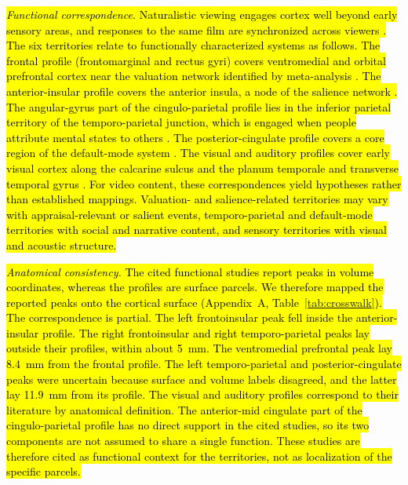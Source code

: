 \documentclass{ieeeaccess}
\newcommand{\rev}[1]{\hl{#1}}
\newcommand{\rev}[1]{#1}
\begin{document}
\rev{\textit{Functional correspondence.} Naturalistic viewing engages cortex well beyond early sensory areas, and responses to the same film are synchronized across viewers \mbox{\cite{hasson2004intersubject}}. The six territories relate to functionally characterized systems as follows. The frontal profile (frontomarginal and rectus gyri) covers ventromedial and orbital prefrontal cortex near the valuation network identified by meta-analysis \mbox{\cite{bartra2013valuation}}. The anterior-insular profile covers the anterior insula, a node of the salience network \mbox{\cite{seeley2007salience}}. The angular-gyrus part of the cingulo-parietal profile lies in the inferior parietal territory of the temporo-parietal junction, which is engaged when people attribute mental states to others \mbox{\cite{saxe2003people}}. The posterior-cingulate profile covers a core region of the default-mode system \mbox{\cite{raichle2001default}}. The visual and auditory profiles cover early visual cortex along the calcarine sulcus \mbox{\cite{wandell2007visual}} and the planum temporale and transverse temporal gyrus \mbox{\cite{griffiths2002planum}}. For video content, these correspondences yield hypotheses rather than established mappings. Valuation- and salience-related territories may vary with appraisal-relevant or salient events, temporo-parietal and default-mode territories with social and narrative content, and sensory territories with visual and acoustic structure.}

\rev{\textit{Anatomical consistency.} The cited functional studies report peaks in volume coordinates, whereas the profiles are surface parcels. We therefore mapped the reported peaks onto the cortical surface (Appendix~A, \mbox{Table~\ref{tab:crosswalk}}). The correspondence is partial. The left frontoinsular peak fell inside the anterior-insular profile. The right frontoinsular and right temporo-parietal peaks lay outside their profiles, within about 5~mm. The ventromedial prefrontal peak lay 8.4~mm from the frontal profile. The left temporo-parietal and posterior-cingulate peaks were uncertain because surface and volume labels disagreed, and the latter lay 11.9~mm from its profile. The visual and auditory profiles correspond to their literature by anatomical definition. The anterior-mid cingulate part of the cingulo-parietal profile has no direct support in the cited studies, so its two components are not assumed to share a single function. These studies are therefore cited as functional context for the territories, not as localization of the specific parcels.}
\end{document}
